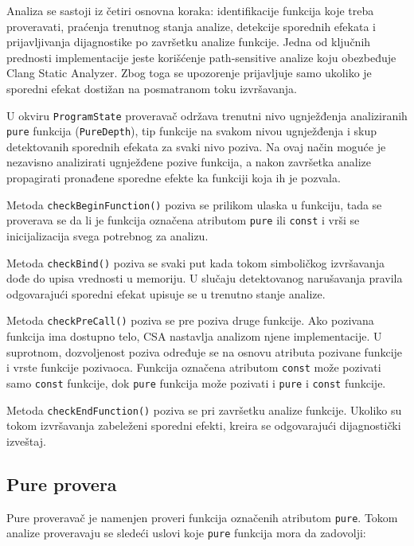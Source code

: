 \documentclass[a4paper,12pt]{article}
\begin{document}
Analiza se sastoji iz četiri osnovna koraka: identifikacije funkcija koje treba proveravati, praćenja trenutnog stanja analize, 
detekcije sporednih efekata i prijavljivanja dijagnostike po završetku analize funkcije. 
Jedna od ključnih prednosti implementacije jeste korišćenje path-sensitive analize koju obezbeđuje Clang Static Analyzer. 
Zbog toga se upozorenje prijavljuje samo ukoliko je sporedni efekat dostižan na posmatranom toku izvršavanja.

U okviru \texttt{ProgramState} proveravač održava trenutni nivo ugnježđenja analiziranih \texttt{pure} funkcija (\texttt{PureDepth}), 
tip funkcije na svakom nivou ugnježđenja i skup detektovanih sporednih efekata za svaki nivo poziva. 
Na ovaj način moguće je nezavisno analizirati ugnježđene pozive funkcija, a nakon završetka analize propagirati pronađene sporedne efekte ka funkciji koja ih je pozvala.


Metoda \texttt{checkBeginFunction()} poziva se prilikom ulaska u funkciju, tada se proverava se da li je funkcija označena atributom \texttt{pure} ili \texttt{const} i vrši se inicijalizacija svega potrebnog za analizu.

Metoda \texttt{checkBind()} poziva se svaki put kada tokom simboličkog izvršavanja dođe do upisa vrednosti u memoriju. 
U slučaju detektovanog narušavanja pravila odgovarajući sporedni efekat upisuje se u trenutno stanje analize.

Metoda \texttt{checkPreCall()} poziva se pre poziva druge funkcije. Ako pozivana funkcija ima dostupno telo, CSA nastavlja analizom njene implementacije. U suprotnom, dozvoljenost poziva određuje se na osnovu atributa pozivane funkcije i vrste funkcije pozivaoca. Funkcija označena atributom \texttt{const} može pozivati samo \texttt{const} funkcije, dok \texttt{pure} funkcija može pozivati i \texttt{pure} i \texttt{const} funkcije.

Metoda \texttt{checkEndFunction()} poziva se pri završetku analize funkcije. Ukoliko su tokom izvršavanja zabeleženi sporedni efekti, kreira se odgovarajući dijagnostički izveštaj. 

\subsection{Pure provera}

Pure proveravač je namenjen proveri funkcija označenih atributom \texttt{pure}. 
Tokom analize proveravaju se sledeći uslovi koje \texttt{pure} funkcija mora da zadovolji:
\end{document}
